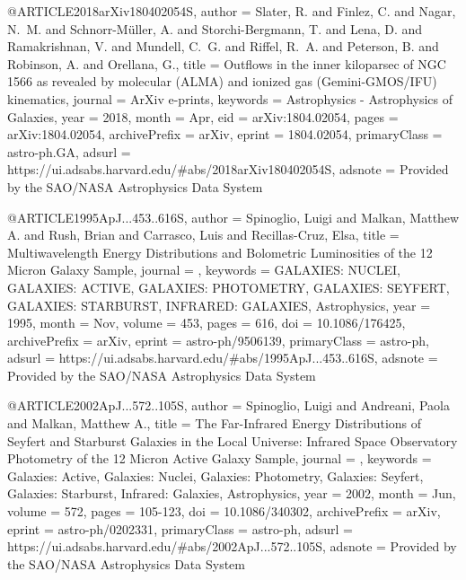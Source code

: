\documentclass[longauth]{aa}
\begin{document}
{{{{@ARTICLE{2018arXiv180402054S,
       author = {{Slater}, R. and {Finlez}, C. and {Nagar}, N.~M. and {Schnorr-M{\"u}ller}, A. and {Storchi-Bergmann}, T. and {Lena}, D. and {Ramakrishnan}, V. and {Mundell}, C.~G. and {Riffel}, R.~A. and {Peterson}, B. and {Robinson}, A. and {Orellana}, G.},
        title = {Outflows in the inner kiloparsec of NGC 1566 as revealed by molecular (ALMA) and ionized gas (Gemini-GMOS/IFU) kinematics},
      journal = {ArXiv e-prints},
     keywords = {Astrophysics - Astrophysics of Galaxies},
         year = 2018,
        month = Apr,
          eid = {arXiv:1804.02054},
        pages = {arXiv:1804.02054},
archivePrefix = {arXiv},
       eprint = {1804.02054},
 primaryClass = {astro-ph.GA},
       adsurl = {https://ui.adsabs.harvard.edu/#abs/2018arXiv180402054S},
      adsnote = {Provided by the SAO/NASA Astrophysics Data System}
}

@ARTICLE{1995ApJ...453..616S,
       author = {{Spinoglio}, Luigi and {Malkan}, Matthew A. and {Rush}, Brian and {Carrasco}, Luis and {Recillas-Cruz}, Elsa},
        title = {Multiwavelength Energy Distributions and Bolometric Luminosities of the 12 Micron Galaxy Sample},
      journal = {\apj},
     keywords = {GALAXIES: NUCLEI, GALAXIES: ACTIVE, GALAXIES: PHOTOMETRY, GALAXIES: SEYFERT, GALAXIES: STARBURST, INFRARED: GALAXIES, Astrophysics},
         year = 1995,
        month = Nov,
       volume = {453},
        pages = {616},
          doi = {10.1086/176425},
archivePrefix = {arXiv},
       eprint = {astro-ph/9506139},
 primaryClass = {astro-ph},
       adsurl = {https://ui.adsabs.harvard.edu/#abs/1995ApJ...453..616S},
      adsnote = {Provided by the SAO/NASA Astrophysics Data System}
}

@ARTICLE{2002ApJ...572..105S,
       author = {{Spinoglio}, Luigi and {Andreani}, Paola and {Malkan}, Matthew A.},
        title = {The Far-Infrared Energy Distributions of Seyfert and Starburst Galaxies in the Local Universe: Infrared Space Observatory Photometry of the 12 Micron Active Galaxy Sample},
      journal = {\apj},
     keywords = {Galaxies: Active, Galaxies: Nuclei, Galaxies: Photometry, Galaxies: Seyfert, Galaxies: Starburst, Infrared: Galaxies, Astrophysics},
         year = 2002,
        month = Jun,
       volume = {572},
        pages = {105-123},
          doi = {10.1086/340302},
archivePrefix = {arXiv},
       eprint = {astro-ph/0202331},
 primaryClass = {astro-ph},
       adsurl = {https://ui.adsabs.harvard.edu/#abs/2002ApJ...572..105S},
      adsnote = {Provided by the SAO/NASA Astrophysics Data System}
}

}}}}
\end{document}
